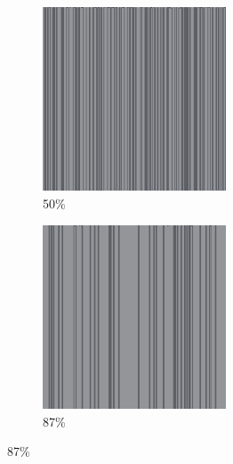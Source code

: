 \documentclass[12pt, fleqn]{report}                             %
\theoremstyle{break}                                            %
\begin{document}
\begin{figure}[ht!]
\begin{subfigure}[b]{0.4\linewidth}
          \includegraphics[width=0.6\textwidth]{Images/33/c.png}
          \caption{50\%}
        \end{subfigure}
        \begin{subfigure}[b]{0.4\linewidth}
          \includegraphics[width=0.6\textwidth]{Images/33/d.png}
          \caption{87\%}
        \end{subfigure}
      \end{figure}
\end{document}
